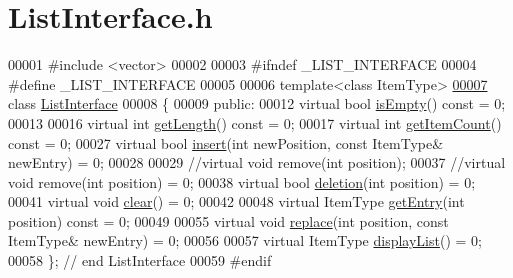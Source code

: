 \hypertarget{ListInterface_8h_source}{}\section{List\+Interface.\+h}

\begin{DoxyCode}
00001 \textcolor{preprocessor}{#include <vector>}
00002 
00003 \textcolor{preprocessor}{#ifndef \_LIST\_INTERFACE}
00004 \textcolor{preprocessor}{#define \_LIST\_INTERFACE}
00005 
00006 \textcolor{keyword}{template}<\textcolor{keyword}{class} ItemType>
\hyperlink{classListInterface}{00007} \textcolor{keyword}{class }\hyperlink{classListInterface}{ListInterface}
00008 \{
00009 \textcolor{keyword}{public}:
00012    \textcolor{keyword}{virtual} \textcolor{keywordtype}{bool} \hyperlink{classListInterface_a924f91e7f81d7dcd3fda79bbcc671394}{isEmpty}() \textcolor{keyword}{const} = 0;
00013    
00016    \textcolor{keyword}{virtual} \textcolor{keywordtype}{int} \hyperlink{classListInterface_afc85695d4137f1e29ff02e179c9f3221}{getLength}() \textcolor{keyword}{const} = 0;
00017    \textcolor{keyword}{virtual} \textcolor{keywordtype}{int} \hyperlink{classListInterface_a3e085e6ea9c5dc3e8007010cd889159c}{getItemCount}() \textcolor{keyword}{const} = 0;
00027    \textcolor{keyword}{virtual} \textcolor{keywordtype}{bool} \hyperlink{classListInterface_a5b2f86954a86172699a3495982c38e77}{insert}(\textcolor{keywordtype}{int} newPosition, \textcolor{keyword}{const} ItemType& newEntry) = 0;
00028 
00029    \textcolor{comment}{//virtual void remove(int position);}
00037 \textcolor{comment}{}   \textcolor{comment}{//virtual void remove(int position) = 0;}
00038    \textcolor{keyword}{virtual} \textcolor{keywordtype}{bool} \hyperlink{classListInterface_a68520ce2942ec716c745b1137c50a3c6}{deletion}(\textcolor{keywordtype}{int} position) = 0;
00041    \textcolor{keyword}{virtual} \textcolor{keywordtype}{void} \hyperlink{classListInterface_adfda414908b645bdf19bcab8269168b7}{clear}() = 0;
00042    
00048    \textcolor{keyword}{virtual} ItemType \hyperlink{classListInterface_a86987f69e5056d287212ede41db1956a}{getEntry}(\textcolor{keywordtype}{int} position) \textcolor{keyword}{const} = 0;
00049    
00055    \textcolor{keyword}{virtual} \textcolor{keywordtype}{void} \hyperlink{classListInterface_aae877a56b7b9f5f526c37a00e234fad1}{replace}(\textcolor{keywordtype}{int} position, \textcolor{keyword}{const} ItemType& newEntry) = 0;
00056 
00057    \textcolor{keyword}{virtual} ItemType \hyperlink{classListInterface_a2f2f533e962dd89111ee50b972dc28e7}{displayList}() = 0;
00058 \}; \textcolor{comment}{// end ListInterface}
00059 \textcolor{preprocessor}{#endif}
\end{DoxyCode}
